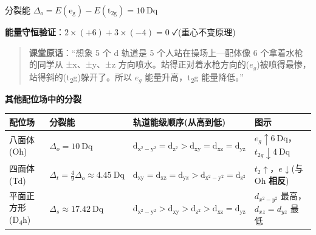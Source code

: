 \documentclass[a4paper,11pt]{ctexart}
\newcounter{none}
\newcommand{\箭}{\ensuremath{\rightarrow}}
\newcommand{\左箭}{\ensuremath{\leftarrow}}
\newcommand{\上箭}{\ensuremath{\uparrow}}
\newcommand{\下箭}{\ensuremath{\downarrow}}
\newcommand{\衡}{\ensuremath{\rightleftharpoons}}
\newcommand{\双箭}{\ensuremath{\leftrightarrow}}
\newcommand{\约等于}{\ensuremath{\approx}}
\newcommand{\小于等于}{\ensuremath{\leq}}
\newcommand{\大于等于}{\ensuremath{\geq}}
\newcommand{\不等于}{\ensuremath{\neq}}
\newcommand{\西格马}{\ensuremath{\sigma}}
\newcommand{\派}{\ensuremath{\pi}}
\begin{document}
分裂能 \(\Delta_o = E(\mathrm{e_g}) - E(\mathrm{t_{2g}}) = 10\ \mathrm{Dq}\)

\textbf{能量守恒验证}：\(2 \times (+6) + 3 \times (-4) = 0\) ✓(重心不变原理)

\begin{quote}
\textbf{课堂原话}：``想象 5 个 d 轨道是 5 个人站在操场上---配体像 6 个拿着水枪的同学从 ±x、±y、±z 方向喷水。站得正对着水枪方向的(\(e_g\))被喷得最惨，站得斜的(t\textsubscript{2}g)躲开了。所以 \(e_g\) 能量升高，t\textsubscript{2}g 能量降低。''
\end{quote}

\textbf{其他配位场中的分裂}

{\def\LTcaptype{none} %
\begin{longtable}[]{@{}
  >{\centering\arraybackslash}p{}
  >{\centering\arraybackslash}p{}
  >{\raggedright\arraybackslash}p{}
  >{\centering\arraybackslash}p{}@{}}
\toprule\noalign{}
\begin{minipage}[b]{\linewidth}\centering
配位场
\end{minipage} & \begin{minipage}[b]{\linewidth}\centering
分裂能
\end{minipage} & \begin{minipage}[b]{\linewidth}\raggedright
轨道能级顺序(从高到低)
\end{minipage} & \begin{minipage}[b]{\linewidth}\centering
图示
\end{minipage} \\
\midrule\noalign{}
\endhead
\bottomrule\noalign{}
\endlastfoot
八面体(Oh) & \(\Delta_o = 10\ \mathrm{Dq}\) & \(\mathrm{d_{x^2-y^2} = d_{z^2} > d_{xy} = d_{xz} = d_{yz}}\) & \(e_g \uparrow 6\ \mathrm{Dq}\)，\(t_{2g} \downarrow 4\ \mathrm{Dq}\) \\
四面体(Td) & \(\Delta_t = \frac{4}{9}\Delta_o \approx 4.45\ \mathrm{Dq}\) & \(\mathrm{d_{xy} = d_{xz} = d_{yz} > d_{x^2-y^2} = d_{z^2}}\) & \(t_2 \uparrow\)，\(e \downarrow\)(与 Oh \textbf{相反}) \\
平面正方形(D\textsubscript{4}h) & \(\Delta_s \approx 17.42\ \mathrm{Dq}\) & \(\mathrm{d_{x^2-y^2} > d_{xy} > d_{z^2} > d_{xz} = d_{yz}}\) & \(d_{x^2-y^2}\) 最高，\(d_{xz}=d_{yz}\) 最低 \\
\end{longtable}
}
\end{document}
